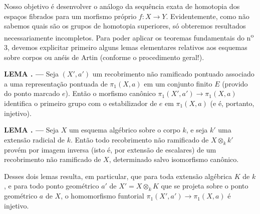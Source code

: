 \documentclass[11pt,twoside,openany]{book}
\numberwithin{equation}{section}
\newcommand{\src}[1]{%
  \phantomsection\hypertarget{src:#1}{}%
  \marginpar{\raggedleft\footnotesize\sffamily #1}%
}
\theoremstyle{plain}
\theoremstyle{definition}
\theoremstyle{remark}
\newcommand{\result}[2]{%
  \par\medskip\noindent\textbf{#1%
  \if\relax\detokenize{#2}\relax\else\space#2\fi. ---}\enspace
}
\newcommand{\FgaUnitKey}{frontmatter}
\renewcommand{\src}[1]{%
  \phantomsection\hypertarget{src:\FgaUnitKey:#1}{}%
  \marginpar{\raggedleft\footnotesize\sffamily #1}%
}
\begin{document}
\src{211}
Nosso objetivo é desenvolver o análogo da sequência exata de homotopia
dos espaços fibrados para um morfismo próprio $f:X\longrightarrow Y$.
Evidentemente, como não sabemos quais são os grupos de homotopia superiores, só
obteremos resultados necessariamente incompletos. Para poder aplicar os
teoremas fundamentais do n\textsuperscript{o} 3, devemos explicitar primeiro
alguns lemas elementares relativos aos esquemas sobre corpos ou anéis de
Artin (conforme o procedimento geral!).

\result{LEMA}{1} Seja $(X',a')$ um recobrimento não ramificado pontuado associado
a uma representação pontuada de $\pi_1(X,a)$ em um conjunto finito $E$
(provido do ponto marcado $e$). Então o morfismo canônico
$\pi_1(X',a')\longrightarrow\pi_1(X,a)$ identifica o primeiro grupo com o
estabilizador de $e$ em $\pi_1(X,a)$ (e é, portanto, injetivo).

\result{LEMA}{2} Seja $X$ um esquema algébrico sobre o corpo $k$, e seja $k'$
uma extensão radicial de $k$. Então todo recobrimento não ramificado de
$X\otimes_k k'$ provém por imagem inversa (isto é, por extensão de
escalares) de um recobrimento não ramificado de $X$, determinado salvo
isomorfismo canônico.

Desses dois lemas resulta, em particular, que para toda extensão algébrica
$K$ de $k$, e para todo ponto geométrico $a'$ de $X'=X\otimes_k K$ que se
projeta sobre o ponto geométrico $a$ de $X$, o homomorfismo funtorial
$\pi_1(X',a')\longrightarrow\pi_1(X,a)$ é injetivo.
\end{document}

